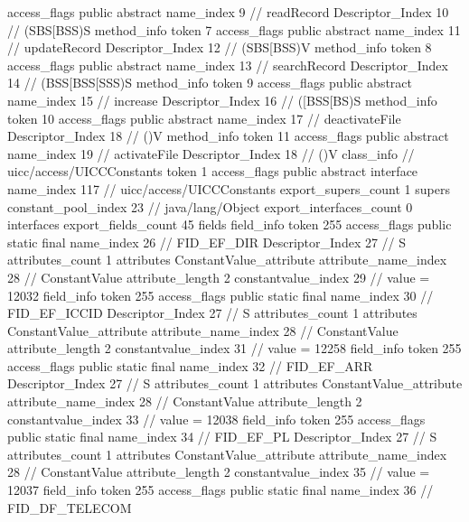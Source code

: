 {{{{{					access_flags	public abstract
					name_index	9		// readRecord
					Descriptor_Index	10		// (SBS[BSS)S
				}
				method_info {
					token	7
					access_flags	public abstract
					name_index	11		// updateRecord
					Descriptor_Index	12		// (SBS[BSS)V
				}
				method_info {
					token	8
					access_flags	public abstract
					name_index	13		// searchRecord
					Descriptor_Index	14		// (BSS[BSS[SSS)S
				}
				method_info {
					token	9
					access_flags	public abstract
					name_index	15		// increase
					Descriptor_Index	16		// ([BSS[BS)S
				}
				method_info {
					token	10
					access_flags	public abstract
					name_index	17		// deactivateFile
					Descriptor_Index	18		// ()V
				}
				method_info {
					token	11
					access_flags	public abstract
					name_index	19		// activateFile
					Descriptor_Index	18		// ()V
				}
			}
		}
		class_info {		// uicc/access/UICCConstants
			token	1
			access_flags	public abstract interface
			name_index	117		// uicc/access/UICCConstants
			export_supers_count	1
			supers {
				constant_pool_index	23		// java/lang/Object
			}
			export_interfaces_count	0
			interfaces {
			}
			export_fields_count	45
			fields {
			field_info {
				token	255
				access_flags	public static final
				name_index	26		// FID_EF_DIR
				Descriptor_Index	27		// S
				attributes_count	1
				attributes {
				ConstantValue_attribute {
					attribute_name_index	28		// ConstantValue
					attribute_length	2
					constantvalue_index	29		// value = 12032
				}
				}
			}
			field_info {
				token	255
				access_flags	public static final
				name_index	30		// FID_EF_ICCID
				Descriptor_Index	27		// S
				attributes_count	1
				attributes {
				ConstantValue_attribute {
					attribute_name_index	28		// ConstantValue
					attribute_length	2
					constantvalue_index	31		// value = 12258
				}
				}
			}
			field_info {
				token	255
				access_flags	public static final
				name_index	32		// FID_EF_ARR
				Descriptor_Index	27		// S
				attributes_count	1
				attributes {
				ConstantValue_attribute {
					attribute_name_index	28		// ConstantValue
					attribute_length	2
					constantvalue_index	33		// value = 12038
				}
				}
			}
			field_info {
				token	255
				access_flags	public static final
				name_index	34		// FID_EF_PL
				Descriptor_Index	27		// S
				attributes_count	1
				attributes {
				ConstantValue_attribute {
					attribute_name_index	28		// ConstantValue
					attribute_length	2
					constantvalue_index	35		// value = 12037
				}
				}
			}
			field_info {
				token	255
				access_flags	public static final
				name_index	36		// FID_DF_TELECOM
}}}}}
